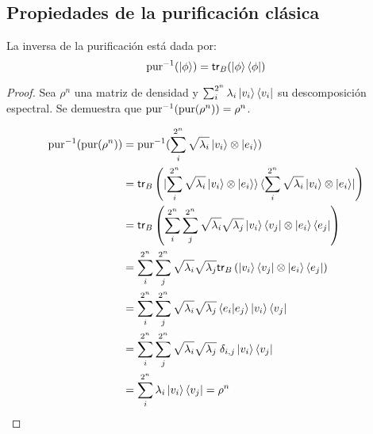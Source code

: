\subsection{Propiedades de la purificación clásica}


\begin{teorema}\label{teo:pur_inv1}
    La inversa de la purificación está dada por:
    \begin{equation*}
        \text{pur}^{-1}(\ket{\phi}) = \mathsf{tr}_B(\ket{\phi}\bra{\phi})
    \end{equation*}
\end{teorema}
\begin{proof}
    Sea $\rho^n$ una matriz de densidad y $\sum_i^{2^n} \lambda_i \ket{v_i}\bra{v_i}$ su descomposición espectral. Se demuestra que $\text{pur}^{-1}(\text{pur}(\rho^n)) = \rho^n$.

\begin{align*}
    \text{pur}^{-1}(\text{pur}(\rho^n)) &= \text{pur}^{-1}(\sum_i^{2^n} \sqrt{\lambda_i}\ket{v_i}\otimes\ket{e_i}) \\
    &= \mathsf{tr}_B\left(\ket{\sum_i^{2^n} \sqrt{\lambda_i}\ket{v_i}\otimes\ket{e_i}}\bra{\sum_i^{2^n} \sqrt{\lambda_i}\ket{v_i}\otimes\ket{e_i}}\right) \\
    &= \mathsf{tr}_B\left(\sum_i^{2^n} \sum_j^{2^n} \sqrt{\lambda_i}\sqrt{\lambda_j} \ket{v_i}\bra{v_j}\otimes\ket{e_i} \bra{e_j}\right) \\
    &= \sum_i^{2^n} \sum_j^{2^n} \sqrt{\lambda_i}\sqrt{\lambda_j} \mathsf{tr}_B\left( \ket{v_i}\bra{v_j} \otimes\ket{e_i} \bra{e_j}\right) \\
    &= \sum_i^{2^n} \sum_j^{2^n} \sqrt{\lambda_i}\sqrt{\lambda_j}  \braket{e_i|e_j} \ket{v_i} \bra{v_j} \\
    &= \sum_i^{2^n} \sum_j^{2^n} \sqrt{\lambda_i}\sqrt{\lambda_j}  \;\delta_{i,j} \ket{v_i} \bra{v_j}\\
    &= \sum_i^{2^n} \lambda_i  \ket{v_i} \bra{v_j} = \rho^n
\end{align*}
\end{proof}

